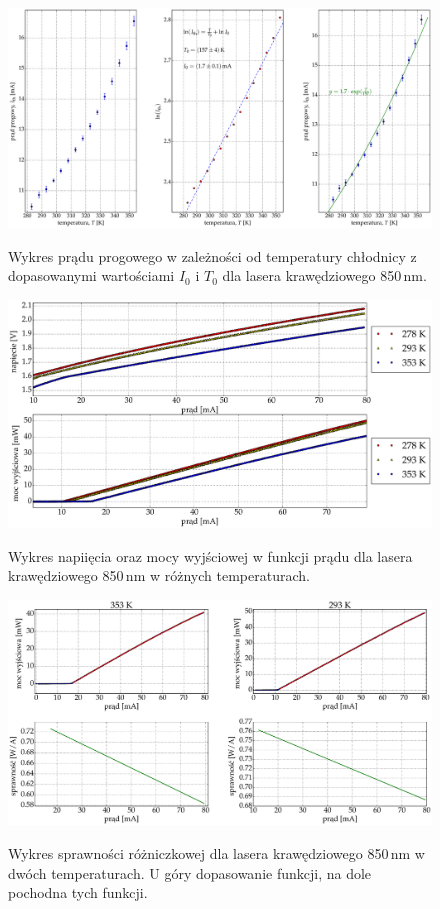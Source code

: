 \begin{figure}
\center
  \includegraphics[scale=0.30]{plot_edge_850/plot_fit.eps}
  \label{rys1}
  \caption{Wykres prądu progowego w zależności od temperatury chłodnicy z dopasowanymi wartościami $I_{0}$ i $T_{0}$ dla lasera krawędziowego 850\,nm.}
  \label{fig:plot_fit_850}
\end{figure}
\begin{figure}
\center
  \includegraphics[scale=0.30]{plot_edge_850/plot_i_v_i_l.eps}
  \label{rys1}
  \caption{Wykres napiięcia oraz mocy wyjściowej w funkcji prądu dla lasera krawędziowego 850\,nm w różnych temperaturach.}
  \label{fig:plot_i_v_i_l_850}
\end{figure}
\begin{figure}
\center
  \includegraphics[scale=0.30]{plot_edge_850/eff_via_current4.eps}
  \label{rys1}
  \caption{Wykres sprawności różniczkowej dla lasera krawędziowego 850\,nm w dwóch temperaturach. U góry dopasowanie funkcji,
  na dole pochodna tych funkcji.}
  \label{fig:eff_via_current4_850}
\end{figure}
